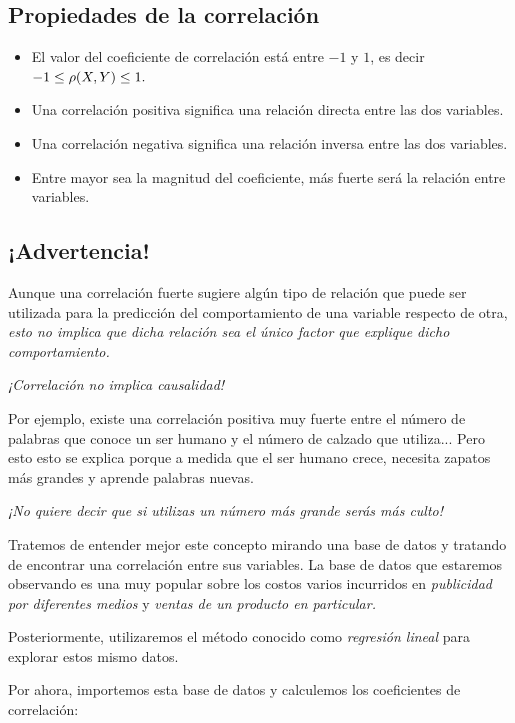 \subsection{Propiedades de la correlación}
\begin{itemize}
	\item El valor del coeficiente de correlación está entre $-1$ y $1$, es decir $-1\leq  \rho(X,Y)  \leq 1.$ 
	\item Una correlación positiva significa una relación directa entre las dos variables. 
	\item Una correlación negativa significa una relación inversa entre las dos variables. 
	\item Entre mayor sea la magnitud del coeficiente, más fuerte será la relación entre variables.
\end{itemize}


\subsection{¡Advertencia!}
Aunque una correlación fuerte sugiere algún tipo de relación que puede ser utilizada para la predicción del comportamiento de una variable respecto de otra, \emph{esto no implica que dicha relación sea el único factor que explique dicho comportamiento.}


\begin{observacion}
	\emph{¡Correlación no implica causalidad!}
\end{observacion}



Por ejemplo, existe una correlación positiva muy fuerte entre el número de palabras que conoce un ser humano y el número de calzado que utiliza...  Pero esto esto se explica porque a medida que el ser humano crece, necesita zapatos más grandes y aprende palabras nuevas. 

\emph{¡No quiere decir que si utilizas un número más grande serás más culto!}


Tratemos de entender mejor este concepto mirando una base de datos y tratando de encontrar una correlación entre sus variables.  La base de datos que estaremos observando es una muy popular sobre los costos varios incurridos en \emph{publicidad por diferentes medios} y \emph{ventas de un producto en particular.}


Posteriormente, utilizaremos el método conocido como \emph{regresión lineal} para explorar estos mismo datos.

Por ahora, importemos esta base de datos y calculemos los coeficientes de correlación:

